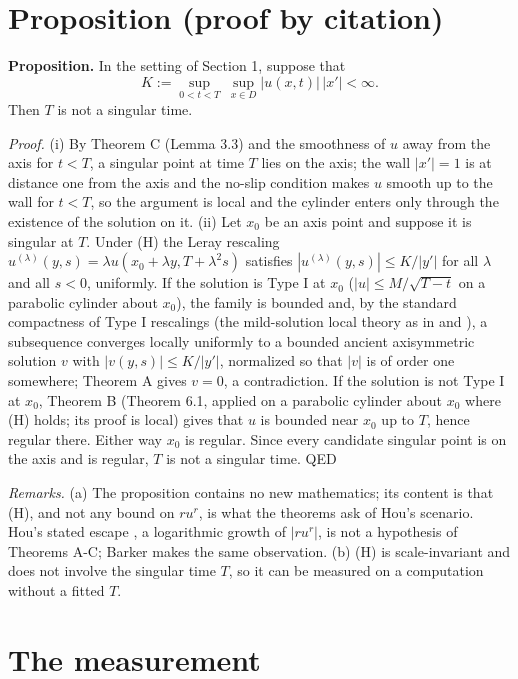 \documentclass[11pt]{article}
\begin{document}
\section{Proposition (proof by citation)}

\noindent\textbf{Proposition.} In the setting of Section 1, suppose that
\begin{equation}
K := \sup_{0 < t < T}\ \sup_{x \in D} |u(x, t)|\,|x'| < \infty. \tag{H}
\end{equation}
Then $T$ is not a singular time.

\medskip
\emph{Proof.} (i) By Theorem C (Lemma 3.3) and the smoothness of $u$ away from the axis for $t < T$, a singular point at time $T$ lies on the axis; the wall $|x'| = 1$ is at distance one from the axis and the no-slip condition makes $u$ smooth up to the wall for $t < T$, so the argument is local and the cylinder enters only through the existence of the solution on it. (ii) Let $x_0$ be an axis point and suppose it is singular at $T$. Under (H) the Leray rescaling $u^{(\lambda)}(y, s) = \lambda u(x_0 + \lambda y, T + \lambda^2 s)$ satisfies $|u^{(\lambda)}(y, s)| \le K / |y'|$ for all $\lambda$ and all $s < 0$, uniformly. If the solution is Type I at $x_0$ ($|u| \le M / \sqrt{T - t}$ on a parabolic cylinder about $x_0$), the family is bounded and, by the standard compactness of Type I rescalings (the mild-solution local theory as in \cite{SS09} and \cite{AB19}), a subsequence converges locally uniformly to a bounded ancient axisymmetric solution $v$ with $|v(y, s)| \le K / |y'|$, normalized so that $|v|$ is of order one somewhere; Theorem A gives $v = 0$, a contradiction. If the solution is not Type I at $x_0$, Theorem B (Theorem 6.1, applied on a parabolic cylinder about $x_0$ where (H) holds; its proof is local) gives that $u$ is bounded near $x_0$ up to $T$, hence regular there. Either way $x_0$ is regular. Since every candidate singular point is on the axis and is regular, $T$ is not a singular time. QED

\medskip
\emph{Remarks.} (a) The proposition contains no new mathematics; its content is that (H), and not any bound on $r u^r$, is what the theorems ask of Hou's scenario. Hou's stated escape \cite[Sec. 1.5]{H24}, a logarithmic growth of $|r u^r|$, is not a hypothesis of Theorems A-C; Barker \cite{B25} makes the same observation. (b) (H) is scale-invariant and does not involve the singular time $T$, so it can be measured on a computation without a fitted $T$.

\section{The measurement}
\end{document}
